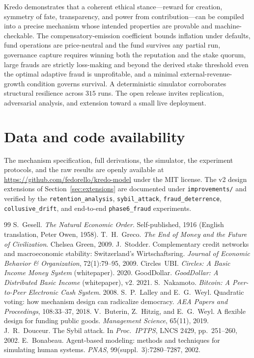\documentclass[11pt]{article}
\theoremstyle{plain}
\theoremstyle{definition}
\theoremstyle{remark}
\begin{document}
Kredo demonstrates that a coherent ethical stance---reward for creation, symmetry of fate, transparency, and power from contribution---can be compiled into a precise mechanism whose intended properties are provable and machine-checkable. The compensatory-emission coefficient bounds inflation under defaults, fund operations are price-neutral and the fund survives any partial run, governance capture requires winning both the reputation and the stake quorum, large frauds are strictly loss-making and beyond the derived stake threshold even the optimal adaptive fraud is unprofitable, and a minimal external-revenue-growth condition governs survival. A deterministic simulator corroborates structural resilience across $315$ runs. The open release invites replication, adversarial analysis, and extension toward a small live deployment.

\section*{Data and code availability}

The mechanism specification, full derivations, the simulator, the experiment protocols, and the raw results are openly available at \url{https://github.com/fedorello/kredo-model} under the MIT license. The v2 design extensions of Section~\ref{sec:extensions} are documented under \texttt{improvements/} and verified by the \texttt{retention\_analysis}, \texttt{sybil\_attack}, \texttt{fraud\_deterrence}, \texttt{collusive\_drift}, and end-to-end \texttt{phase6\_fraud} experiments.

\begin{thebibliography}{99}
 S.~Gesell. \emph{The Natural Economic Order}. Self-published, 1916 (English translation, Peter Owen, 1958).
 T.~H.~Greco. \emph{The End of Money and the Future of Civilization}. Chelsea Green, 2009.
 J.~Stodder. Complementary credit networks and macroeconomic stability: Switzerland's Wirtschaftsring. \emph{Journal of Economic Behavior \& Organization}, 72(1):79--95, 2009.
 Circles~UBI. \emph{Circles: A Basic Income Money System} (whitepaper). 2020.
 GoodDollar. \emph{GoodDollar: A Distributed Basic Income} (whitepaper), v2. 2021.
 S.~Nakamoto. \emph{Bitcoin: A Peer-to-Peer Electronic Cash System}. 2008.
 S.~P.~Lalley and E.~G.~Weyl. Quadratic voting: how mechanism design can radicalize democracy. \emph{AEA Papers and Proceedings}, 108:33--37, 2018.
 V.~Buterin, Z.~Hitzig, and E.~G.~Weyl. A flexible design for funding public goods. \emph{Management Science}, 65(11), 2019.
 J.~R.~Douceur. The Sybil attack. In \emph{Proc.\ IPTPS}, LNCS 2429, pp.~251--260, 2002.
 E.~Bonabeau. Agent-based modeling: methods and techniques for simulating human systems. \emph{PNAS}, 99(suppl.~3):7280--7287, 2002.
\end{thebibliography}
\end{document}
